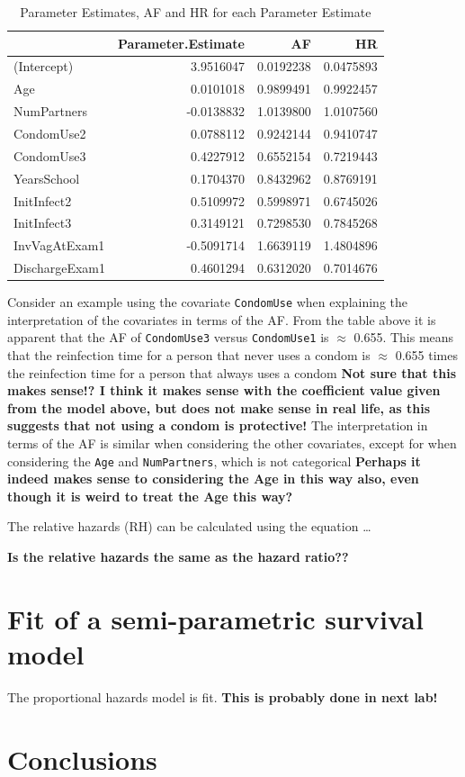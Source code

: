 \documentclass[
]{article}
\begin{document}
\begin{table}

\caption{\label{tab:unnamed-chunk-6}Parameter Estimates, AF and HR for each Parameter Estimate}
\centering
\begin{tabular}[t]{l|r|r|r}
\hline
  & Parameter.Estimate & AF & HR\\
\hline
(Intercept) & 3.9516047 & 0.0192238 & 0.0475893\\
\hline
Age & 0.0101018 & 0.9899491 & 0.9922457\\
\hline
NumPartners & -0.0138832 & 1.0139800 & 1.0107560\\
\hline
CondomUse2 & 0.0788112 & 0.9242144 & 0.9410747\\
\hline
CondomUse3 & 0.4227912 & 0.6552154 & 0.7219443\\
\hline
YearsSchool & 0.1704370 & 0.8432962 & 0.8769191\\
\hline
InitInfect2 & 0.5109972 & 0.5998971 & 0.6745026\\
\hline
InitInfect3 & 0.3149121 & 0.7298530 & 0.7845268\\
\hline
InvVagAtExam1 & -0.5091714 & 1.6639119 & 1.4804896\\
\hline
DischargeExam1 & 0.4601294 & 0.6312020 & 0.7014676\\
\hline
\end{tabular}
\end{table}

Consider an example using the covariate \texttt{CondomUse} when explaining the interpretation of the covariates in terms of the AF. From the table above it is apparent that the AF of \texttt{CondomUse3} versus \texttt{CondomUse1} is \(\approx\) 0.655. This means that the reinfection time for a person that never uses a condom is \(\approx\) 0.655 times the reinfection time for a person that always uses a condom \textbf{Not sure that this makes sense!? I think it makes sense with the coefficient value given from the model above, but does not make sense in real life, as this suggests that not using a condom is protective!} The interpretation in terms of the AF is similar when considering the other covariates, except for when considering the \texttt{Age} and \texttt{NumPartners}, which is not categorical \textbf{Perhaps it indeed makes sense to considering the Age in this way also, even though it is weird to treat the Age this way?}

The relative hazards (RH) can be calculated using the equation \ldots{}

\textbf{Is the relative hazards the same as the hazard ratio??}

\hypertarget{fit-of-a-semi-parametric-survival-model}{%
\section{Fit of a semi-parametric survival model}\label{fit-of-a-semi-parametric-survival-model}}

The proportional hazards model is fit. \textbf{This is probably done in next lab!}

\hypertarget{conclusions}{%
\section{Conclusions}\label{conclusions}}
\end{document}
